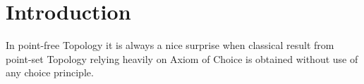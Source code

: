 \chapter{Introduction}
\cite{picado2011frames}

In point-free Topology it is always a nice surprise when classical result from point-set Topology relying heavily on Axiom of Choice is obtained without use of any choice principle.

